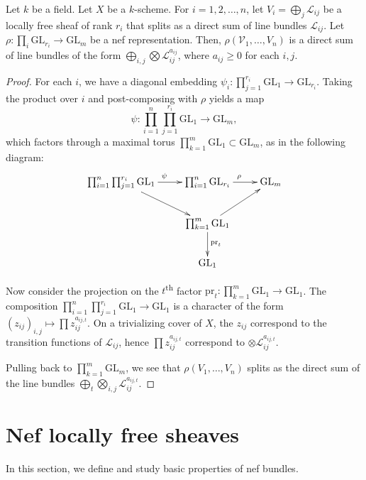 \begin{lemma}
\label{lemma-tensor-of-split-bundle}
Let $k$ be a field.
Let $X$ be a $k$-scheme.
For $i = 1, 2, \ldots, n$, let $V_i = \bigoplus_j \mathcal{L}_{ij}$ be a
locally free sheaf of rank $r_i$ that splits as a direct sum of line bundles
$\mathcal{L}_{ij}$.
Let $\rho : \prod_i \mathrm{GL}_{r_i} \to \mathrm{GL}_m$ be a nef
representation.
Then, $\rho(\mathcal{V}_1,\ldots,V_n)$ is a direct sum of line bundles of the
form $\bigoplus_{i,j}\bigotimes\mathcal{L}_{ij}^{a_{ij}}$, where $a_{ij}\ge0$ for
each $i,j$.
\end{lemma}

\begin{proof}
For each $i$, we have a diagonal embedding
$\psi_i : \prod_{j = 1}^{r_i}\mathrm{GL}_1 \to \mathrm{GL}_{r_i}$.
Taking the product over $i$ and post-composing with $\rho$ yields a map
$$
  \psi : \prod_{i = 1}^n \prod_{j = 1}^{r_i} \mathrm{GL}_1 \to \mathrm{GL}_m,
$$
which factors through a maximal torus
$\prod_{k = 1}^m \mathrm{GL}_1 \subset \mathrm{GL}_m$,
as in the following diagram:
$$
\xymatrix{
  \prod_{i = 1}^n \prod_{j = 1}^{r_i} \mathrm{GL}_1 \ar[r]^\psi \ar[rd] &
  \prod_{i = 1}^{n} \mathrm{GL}_{r_i} \ar[r]^\rho &
  \mathrm{GL}_m \\
    &
  \prod_{k = 1}^m \mathrm{GL}_1 \ar[ru] \ar[d]^{\mathrm{pr}_t} \\
    &
  \mathrm{GL}_1
}
$$

Now consider the projection on the $t$\textsuperscript{th} factor
$\mathrm{pr}_t : \prod_{k = 1}^m \mathrm{GL}_1\to \mathrm{GL}_1$.
The composition
$\prod_{i = 1}^n \prod_{j = 1}^{r_i} \mathrm{GL}_1\to \mathrm{GL}_1$ is a
character of the form $(z_{ij})_{i,j}\mapsto \prod z_{ij}^{a_{ij,t}}$.
On a trivializing cover of $X$, the $z_{ij}$ correspond to the transition
functions of $\mathcal{L}_{ij}$, hence $\prod z_{ij}^{a_{ij,t}}$ correspond to
$\otimes\mathcal{L}_{ij}^{a_{ij,t}}$.

Pulling back to $\prod_{k = 1}^m \mathrm{GL}_m$,
we see that $\rho(V_1,\ldots,V_n)$ splits as the direct sum of the line bundles
$\bigoplus_t \bigotimes_{i,j} \mathcal{L}_{ij}^{a_{ij,t}}$.
\end{proof}

\section{Nef locally free sheaves}
\label{section-nef-bundles}

In this section, we define and study basic properties of nef
bundles.

